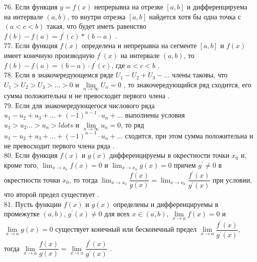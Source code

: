 \documentclass[12pt]{article}
\begin{document}
{76. Если функция ${\displaystyle y=f(x)}$ непрерывна на отрезке ${\displaystyle [a,b]}$ и дифференцируема на интервале ${\displaystyle (a,b)}$, то внутри отрезка ${\displaystyle [a,b]}$ найдется хотя бы одна точка ${\displaystyle с}$ ${(\displaystyle a<c<b)}$ такая, что будет иметь равенство ${\displaystyle f(b)-f(a)=f^{\prime}(c)*(b-a)}$ .\\

77. Если функция ${\displaystyle f(x)}$ определена и непрерывна на сегменте ${\displaystyle [a,b]}$ и ${\displaystyle f(x)}$ имеет конечную производную ${\displaystyle f^{\prime}(x)}$ на интервале ${\displaystyle (a,b)}$, то ${\displaystyle f(b)-f(a)=(b-a)\cdot f^{\prime}(c)}$, где ${\displaystyle a<c<b}$ .\\

78. Если в знакочередующемся ряде ${\displaystyle U_1-U_2+U_3-\ldots}$ члены таковы, что ${\displaystyle U_1>U_2>U_3>\ldots>0}$ и ${\displaystyle \lim \limits _{n \to \infty} U_n=0}$ , то знакочередующийся ряд сходится, его сумма положительна и не превосходит первого члена .\\

79. Если для знакочередующегося числового ряда ${\displaystyle u_1-u_2+u_3+\ldots+(-1)^{n-1}\cdot u_n+\ldots}$ выполнены условия ${\displaystyle u_1>u_2\ldots>u_n>ldots}$ и ${\displaystyle \lim \limits _{n \to \infty} u_n=0}$, то ряд ${\displaystyle u_1-u_2+u_3+\ldots+(-1)^{n-1}\cdot u_n+\ldots}$ сходится, при этом сумма положительна и не превосходит первого члена ряда .\\

80. Если функция ${\displaystyle f(x)}$ и ${\displaystyle g(x)}$ дифференцируемы в окрестности точки ${\displaystyle x_0}$ и, кроме того, ${\displaystyle \lim _{x \to x_0} f(x)=0}$ и ${\displaystyle \lim _{x \to x_0} g(x)=0}$ причем ${\displaystyle g^{\prime}\neq 0}$ в окрестности точки ${\displaystyle x_0}$, то тогда ${\displaystyle \lim _{x \to x_0} \dfrac{f(x)}{g(x)}=\lim _{x \to x_0} \dfrac{f^{\prime}(x)}{g^{\prime}(x)}}$ при условии, что второй предел существует .\\

81. Пусть функции ${\displaystyle f(x)}$ и ${\displaystyle g(x)}$ определены и дифференцируемы в промежутке ${\displaystyle (a,b)}$, ${\displaystyle g^{\prime}(x) \neq 0}$ для всех ${\displaystyle x\in (a,b)}$, ${\displaystyle \lim \limits _{x \to a} f(x)=0}$ и ${\displaystyle \lim \limits _{x \to a} g(x)=0}$  существует конечный или бесконечный предел ${\displaystyle \lim \limits _{x \to a} \dfrac{f^{\prime}(x)}{g^{\prime}(x)}}$, тогда ${\displaystyle \lim \limits _{x \to a}\dfrac{f(x)}{g(x)}=\lim \limits _{x \to a} \dfrac{f^{\prime}(x)}{g^{\prime}(x)}}$ .\\

}
\end{document}
